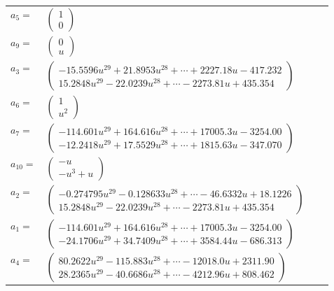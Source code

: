 \documentclass[1p]{elsarticle_modified}
\theoremstyle{definition}
\begin{document}
\begin{tabular}{m{7pt} m{180pt} m{7pt} m{180pt} }
\flushright $a_{5}=$&$\begin{pmatrix}1\\0\end{pmatrix}$ \\
\flushright $a_{9}=$&$\begin{pmatrix}0\\u\end{pmatrix}$ \\
\flushright $a_{3}=$&$\begin{pmatrix}-15.5596 u^{29}+21.8953 u^{28}+\cdots+2227.18 u-417.232\\15.2848 u^{29}-22.0239 u^{28}+\cdots-2273.81 u+435.354\end{pmatrix}$ \\
\flushright $a_{6}=$&$\begin{pmatrix}1\\u^2\end{pmatrix}$ \\
\flushright $a_{7}=$&$\begin{pmatrix}-114.601 u^{29}+164.616 u^{28}+\cdots+17005.3 u-3254.00\\-12.2418 u^{29}+17.5529 u^{28}+\cdots+1815.63 u-347.070\end{pmatrix}$ \\
\flushright $a_{10}=$&$\begin{pmatrix}- u\\- u^3+u\end{pmatrix}$ \\
\flushright $a_{2}=$&$\begin{pmatrix}-0.274795 u^{29}-0.128633 u^{28}+\cdots-46.6332 u+18.1226\\15.2848 u^{29}-22.0239 u^{28}+\cdots-2273.81 u+435.354\end{pmatrix}$ \\
\flushright $a_{1}=$&$\begin{pmatrix}-114.601 u^{29}+164.616 u^{28}+\cdots+17005.3 u-3254.00\\-24.1706 u^{29}+34.7409 u^{28}+\cdots+3584.44 u-686.313\end{pmatrix}$ \\
\flushright $a_{4}=$&$\begin{pmatrix}80.2622 u^{29}-115.883 u^{28}+\cdots-12018.0 u+2311.90\\28.2365 u^{29}-40.6686 u^{28}+\cdots-4212.96 u+808.462\end{pmatrix}$ \\

\end{tabular}
\end{document}
